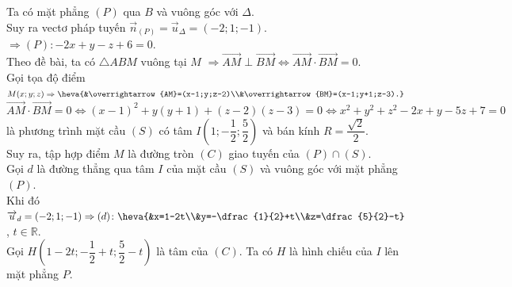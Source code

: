 \begin{ex}
{\begin{center}
		\end{center}
		\noindent
		Ta có mặt phẳng $(P)$ qua $B$ và vuông góc với $\Delta$.\\
		Suy ra vectơ pháp tuyến $\overrightarrow{n}_{(P)}=\overrightarrow{u}_{\Delta}=(-2;1;-1)$.\\
		$\Rightarrow (P)\colon -2x+y-z+6=0$.\\
		Theo đề bài, ta có $\triangle ABM$ vuông tại $M$ $\Rightarrow \overrightarrow{AM}\perp \overrightarrow{BM} \Leftrightarrow \overrightarrow{AM}\cdot\overrightarrow{BM}=0$.\\
		Gọi tọa độ điểm $M(x;y;z) \Rightarrow \heva{&\overrightarrow{AM}=(x-1;y;z-2)\\&\overrightarrow{BM}=(x-1;y+1;z-3).}$\\
		$\overrightarrow{AM}\cdot\overrightarrow{BM}=0 \Leftrightarrow (x-1)^2+y(y+1)+(z-2)(z-3)=0 \Leftrightarrow x^2+y^2+z^2-2x+y-5z+7=0$ là phương trình mặt cầu $(S)$ có tâm $I\left(1;-\dfrac{1}{2};\dfrac{5}{2}\right)$ và bán kính $R=\dfrac{\sqrt{2}}{2}$.\\
		Suy ra, tập hợp điểm $M$ là đường tròn $(C)$ giao tuyến của $(P)\cap (S)$.\\
		Gọi $d$ là đường thẳng qua tâm $I$ của mặt cầu $(S)$ và vuông góc với mặt phẳng $(P)$.\\
		Khi đó $\overrightarrow{u}_{d}=(-2;1;-1) \Rightarrow (d)\colon \heva{&x=1-2t\\&y=-\dfrac{1}{2}+t\\&z=\dfrac{5}{2}-t}$, $t\in \mathbb{R}$.\\
		Gọi $H\left(1-2t;-\dfrac{1}{2}+t;\dfrac{5}{2}-t\right)$ là tâm của $(C)$. Ta có $H$ là hình chiếu của $I$ lên mặt phẳng $P$.\\
}
\end{ex}
